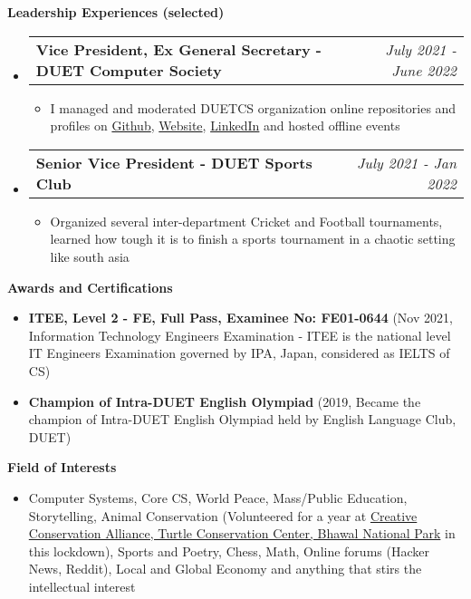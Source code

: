 \documentclass[legalpaper,10pt]{article}
\makeatletter
\newcommand{\resheading}[1]{{\large \colorbox{mygrey}{\begin{minipage}{\textwidth}{\textbf{#1 \vphantom{p\^{E}}}}\end{minipage}}}}
\newcommand{\ressubheading}[4]{
	\begin{tabular*}{7.1in}{l@{\extracolsep{\fill}}r}
		\textbf{#1} & \textit{#4} \\
	\end{tabular*}\vspace{-6pt}}
\makeatother
\begin{document}
	\resheading{Leadership Experiences (selected)}
	\begin{itemize}
		\item \ressubheading{Vice President, Ex General Secretary - DUET Computer Society}{}{}{July 2021 - June 2022}
		\begin{itemize}
		    \item I managed and moderated DUETCS organization online repositories and profiles on \href{https://github.com/duetcs}{Github}, \href{https://duetcs.github.io}{Website}, \href{https://www.linkedin.com/company/duet-computer-society}{LinkedIn} and hosted offline events
		\end{itemize}
		
		\item \ressubheading{Senior Vice President - DUET Sports Club}{}{}{July 2021 - Jan 2022}
		\begin{itemize}
		    \item Organized several inter-department Cricket and Football tournaments, learned how tough it is to finish a sports tournament in a chaotic setting like south asia
		\end{itemize}
		
	\end{itemize}

	\vspace{0.20in}
	
	\resheading{Awards and Certifications}
	\begin{itemize}
	
		\item \textbf{ITEE, Level 2 - FE, Full Pass, Examinee No: FE01-0644} (Nov 2021,  Information Technology Engineers Examination - ITEE is the national level IT Engineers Examination governed by IPA, Japan, considered as IELTS of CS) 
		
		\item \textbf{Champion of Intra-DUET English Olympiad} (2019, Became the champion of Intra-DUET English Olympiad held by English Language Club, DUET)

	\end{itemize}

	\vspace{0.20in}
	
	\resheading{Field of Interests}
		\begin{itemize}
			\item Computer Systems, Core CS,  World Peace, Mass/Public Education, Storytelling, Animal Conservation (Volunteered for a year at \url{} \href{https://www.instagram.com/creativeconservationalliance/}{Creative Conservation Alliance, Turtle Conservation Center, Bhawal National Park} in this lockdown), Sports and Poetry, Chess, Math, Online forums (Hacker News, Reddit), Local and Global Economy and anything that stirs the intellectual interest
		\end{itemize}
\end{document}
